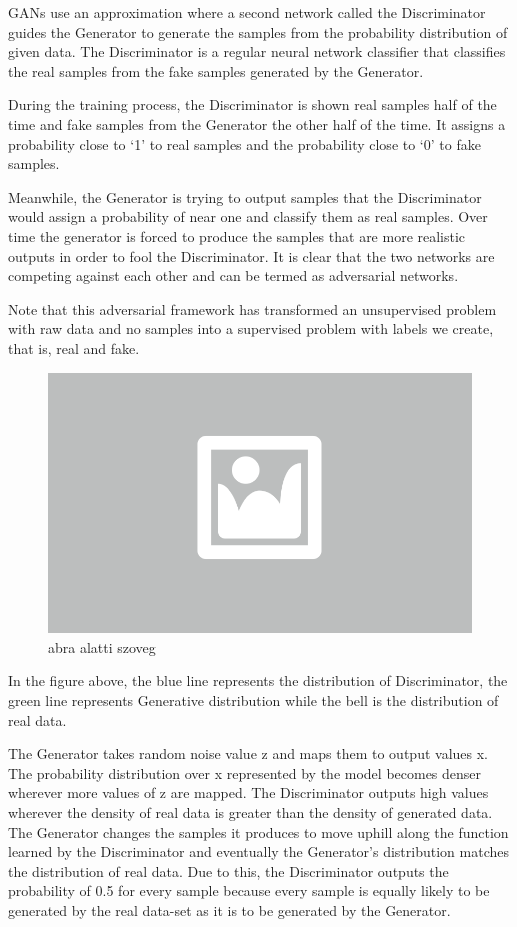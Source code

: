 GANs use an approximation where a second network called the Discriminator guides the Generator to generate the samples from the probability distribution of given data. The Discriminator is a regular neural network classifier that classifies the real samples from the fake samples generated by the Generator.

During the training process, the Discriminator is shown real samples half of the time and fake samples from the Generator the other half of the time. It assigns a probability close to ‘1’ to real samples and the probability close to ‘0’ to fake samples.

Meanwhile, the Generator is trying to output samples that the Discriminator would assign a probability of near one and classify them as real samples. Over time the generator is forced to produce the samples that are more realistic outputs in order to fool the Discriminator. It is clear that the two networks are competing against each other and can be termed as adversarial networks.  

Note that this adversarial framework has transformed an unsupervised problem with raw data and no samples into a supervised problem with labels we create, that is, real and fake. 

\begin{figure}[h]
	\centering
	\includegraphics[width=0.65\columnwidth]{figures/abra.png}
	\caption{abra alatti szoveg}
\end{figure}

In the figure above, the blue line represents the distribution of Discriminator, the green line represents Generative distribution while the bell is the distribution of real data.

The Generator takes random noise value z and maps them to output values x. The probability distribution over x represented by the model becomes denser wherever more values of z are mapped. The Discriminator outputs high values wherever the density of real data is greater than the density of generated data. The Generator changes the samples it produces to move uphill along the function learned by the Discriminator and eventually the Generator’s distribution matches the distribution of real data. Due to this, the Discriminator outputs the probability of 0.5 for every sample because every sample is equally likely to be generated by the real data-set as it is to be generated by the Generator.

